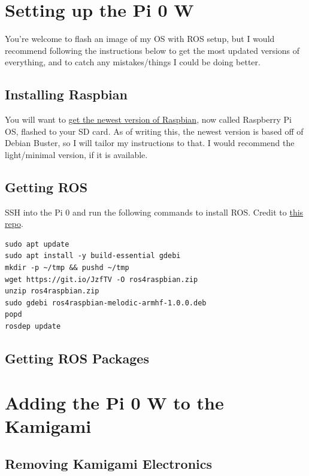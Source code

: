 \documentclass[11pt]{article}
\begin{document}
\section{Setting up the Pi 0 W}

You're welcome to flash an image of my OS with ROS setup, but I would recommend following the instructions below to get the most updated versions of everything, and to catch any mistakes/things I could be doing better.

\subsection{Installing Raspbian}

    You will want to \href{https://www.raspberrypi.org/downloads/raspberry-pi-os/}{get the newest version of Raspbian}, now called Raspberry Pi OS, flashed to your SD card. As of writing this, the newest version is based off of Debian Buster, so I will tailor my instructions to that. I would recommend the light/minimal version, if it is available.

\subsection{Getting ROS}
SSH into the Pi 0 and run the following commands to install ROS. Credit to \href{https://github.com/Tiryoh/ros_melodic_raspbian}{this repo}.

    \begin{verbatim}
sudo apt update
sudo apt install -y build-essential gdebi
mkdir -p ~/tmp && pushd ~/tmp
wget https://git.io/JzfTV -O ros4raspbian.zip
unzip ros4raspbian.zip
sudo gdebi ros4raspbian-melodic-armhf-1.0.0.deb
popd
rosdep update
    \end{verbatim}

\subsection{Getting ROS Packages}

\section{Adding the Pi 0 W to the Kamigami}

\subsection{Removing Kamigami Electronics}
\end{document}
